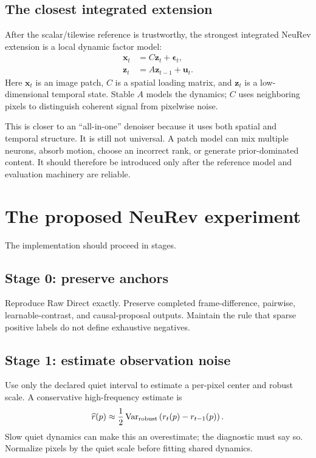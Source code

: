 \documentclass[11pt]{article}
\newcommand{\Var}{\operatorname{Var}}
\begin{document}
\subsection{The closest integrated extension}

After the scalar/tilewise reference is trustworthy, the strongest integrated
NeuRev extension is a local dynamic factor model:
\begin{align}
\bm x_t &= C\bm z_t+\bm\epsilon_t,\\
\bm z_t &= A\bm z_{t-1}+\bm u_t.
\end{align}
Here \(\bm x_t\) is an image patch, \(C\) is a spatial loading matrix, and
\(\bm z_t\) is a low-dimensional temporal state. Stable \(A\) models the
dynamics; \(C\) uses neighboring pixels to distinguish coherent signal from
pixelwise noise.

This is closer to an ``all-in-one'' denoiser because it uses both spatial and
temporal structure. It is still not universal. A patch model can mix multiple
neurons, absorb motion, choose an incorrect rank, or generate prior-dominated
content. It should therefore be introduced only after the reference model and
evaluation machinery are reliable.

\section{The proposed NeuRev experiment}

The implementation should proceed in stages.

\subsection{Stage 0: preserve anchors}

Reproduce Raw Direct exactly. Preserve completed frame-difference, pairwise,
learnable-contrast, and causal-proposal outputs. Maintain the rule that sparse
positive labels do not define exhaustive negatives.

\subsection{Stage 1: estimate observation noise}

Use only the declared quiet interval to estimate a per-pixel center and robust
scale. A conservative high-frequency estimate is
\begin{equation}
\widehat r(p)
\approx
\frac{1}{2}
\Var_{\rm robust}
\left(
r_t(p)-r_{t-1}(p)
\right).
\end{equation}
Slow quiet dynamics can make this an overestimate; the diagnostic must say so.
Normalize pixels by the quiet scale before fitting shared dynamics.
\end{document}
